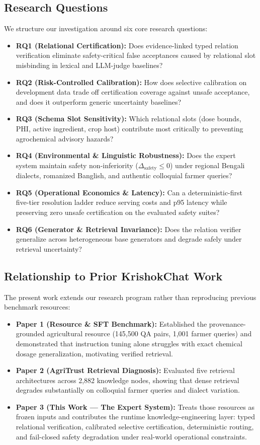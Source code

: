 \documentclass[11pt,a4paper]{article}
\begin{document}
\subsection{Research Questions}
We structure our investigation around six core research questions:
\begin{itemize}[leftmargin=1.8em]
    \item \textbf{RQ1 (Relational Certification):} Does evidence-linked typed relation verification eliminate safety-critical false acceptances caused by relational slot misbinding in lexical and LLM-judge baselines?
    \item \textbf{RQ2 (Risk-Controlled Calibration):} How does selective calibration on development data trade off certification coverage against unsafe acceptance, and does it outperform generic uncertainty baselines?
    \item \textbf{RQ3 (Schema Slot Sensitivity):} Which relational slots (dose bounds, PHI, active ingredient, crop host) contribute most critically to preventing agrochemical advisory hazards?
    \item \textbf{RQ4 (Environmental \& Linguistic Robustness):} Does the expert system maintain safety non-inferiority ($\Delta_{\text{safety}} \le 0$) under regional Bengali dialects, romanized Banglish, and authentic colloquial farmer queries?
    \item \textbf{RQ5 (Operational Economics \& Latency):} Can a deterministic-first five-tier resolution ladder reduce serving costs and p95 latency while preserving zero unsafe certification on the evaluated safety suites?
    \item \textbf{RQ6 (Generator \& Retrieval Invariance):} Does the relation verifier generalize across heterogeneous base generators and degrade safely under retrieval uncertainty?
\end{itemize}

\subsection{Relationship to Prior KrishokChat Work}
The present work extends our research program rather than reproducing previous benchmark resources:
\begin{itemize}[leftmargin=1.5em]
    \item \textbf{Paper 1 (Resource \& SFT Benchmark):} Established the provenance-grounded agricultural resource (145,500 QA pairs, 1,001 farmer queries) and demonstrated that instruction tuning alone struggles with exact chemical dosage generalization, motivating verified retrieval.
    \item \textbf{Paper 2 (AgriTrust Retrieval Diagnosis):} Evaluated five retrieval architectures across 2,882 knowledge nodes, showing that dense retrieval degrades substantially on colloquial farmer queries and dialect variation.
    \item \textbf{Paper 3 (This Work — The Expert System):} Treats those resources as frozen inputs and contributes the runtime knowledge-engineering layer: typed relational verification, calibrated selective certification, deterministic routing, and fail-closed safety degradation under real-world operational constraints.
\end{itemize}
\end{document}
